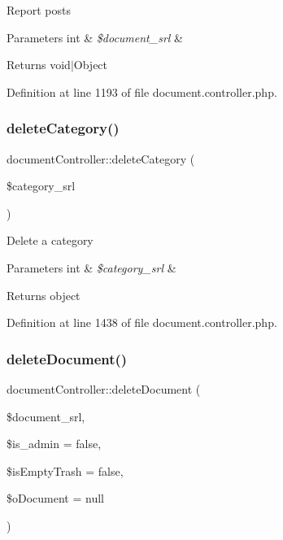 Report posts 
\begin{DoxyParams}[1]{Parameters}
int & {\em \$document\+\_\+srl} & \\
\hline
\end{DoxyParams}
\begin{DoxyReturn}{Returns}
void$\vert$\+Object 
\end{DoxyReturn}


Definition at line 1193 of file document.\+controller.\+php.

\hypertarget{classdocumentController_ad5840bc0f6ed0040779c5d90d8c327a6}{}\label{classdocumentController_ad5840bc0f6ed0040779c5d90d8c327a6} 
\subsubsection{\texorpdfstring{delete\+Category()}{deleteCategory()}}
{\footnotesize\ttfamily document\+Controller\+::delete\+Category (\begin{DoxyParamCaption}\item[{}]{\$category\+\_\+srl }\end{DoxyParamCaption})}

Delete a category 
\begin{DoxyParams}[1]{Parameters}
int & {\em \$category\+\_\+srl} & \\
\hline
\end{DoxyParams}
\begin{DoxyReturn}{Returns}
object 
\end{DoxyReturn}


Definition at line 1438 of file document.\+controller.\+php.

\hypertarget{classdocumentController_a93df4318474646597031e6a1ea50c884}{}\label{classdocumentController_a93df4318474646597031e6a1ea50c884} 
\subsubsection{\texorpdfstring{delete\+Document()}{deleteDocument()}}
{\footnotesize\ttfamily document\+Controller\+::delete\+Document (\begin{DoxyParamCaption}\item[{}]{\$document\+\_\+srl,  }\item[{}]{\$is\+\_\+admin = {\ttfamily false},  }\item[{}]{\$is\+Empty\+Trash = {\ttfamily false},  }\item[{}]{\$o\+Document = {\ttfamily null} }\end{DoxyParamCaption})}

